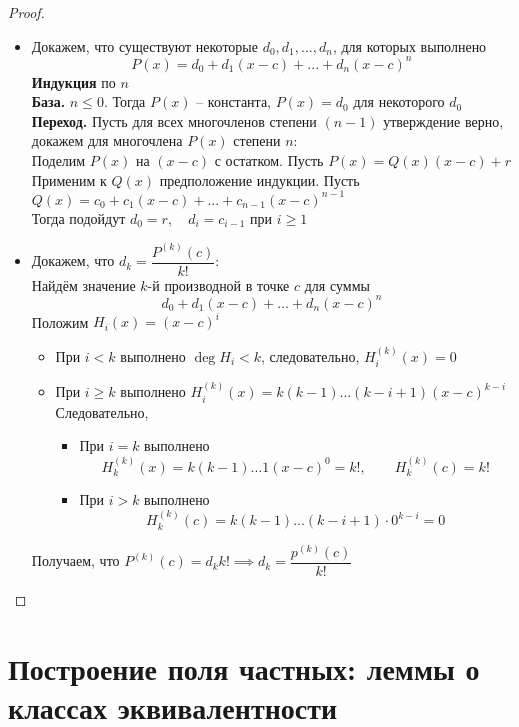\begin{proof}
	\hfill
	\begin{itemize}
		\item Докажем, что существуют некоторые $d_0, d_1, ..., d_n$, для которых выполнено
		$$ P(x) = d_0 + d_1(x - c) + ... + d_n(x - c)^n $$
		\textbf{Индукция} по $n$ \\
		\textbf{База.} $n \le 0 $. Тогда $P(x)$ -- константа, $P(x) = d_0$ для некоторого $d_0$ \\
		\textbf{Переход.} Пусть для всех многочленов степени $(n - 1)$ утверждение верно, докажем для многочлена $P(x)$ степени $n$: \\
		Поделим $P(x)$ на $(x - c)$ с остатком. Пусть $P(x) = Q(x)(x - c) + r$ \\
		Применим к $Q(x)$ предположение индукции. Пусть $Q(x) = c_0 + c_1(x - c) + ... + c_{n - 1}(x - c)^{n - 1} $ \\
		Тогда подойдут $d_0 = r, \quad d_i = c_{i - 1}$ при $i \ge 1$
		\item Докажем, что $d_k = \dfrac{P^{(k)}(c)}{k!}$: \\
		Найдём значение $k$-й производной в точке $c$ для суммы
		$$ d_0 + d_1(x - c) + ... + d_n(x - c)^n $$
		Положим $H_i(x) = (x - c)^i $
		\begin{itemize}
			\item При $i < k$ выполнено $ \deg H_i < k$, следовательно, $H_i^{(k)}(x) = 0 $
			\item При $i \ge k$ выполнено $H_i^{(k)}(x) = k(k - 1)...(k - i + 1)(x - c)^{k - i} $ \\
			Следовательно,
			\begin{itemize}
				\item При $i = k$ выполнено
				$$ H_k^{(k)}(x) = k(k - 1)...1(x - c)^0 = k!, \qquad H_k^{(k)}(c) = k! $$
				\item При $i > k$ выполнено
				$$ H_k^{(k)}(c) = k(k - 1)...(k - i + 1) \cdot 0^{k - i} = 0 $$
			\end{itemize}
		\end{itemize}
		Получаем, что $P^{(k)}(c) = d_kk! \implies d_k = \dfrac{p^{(k)}(c)}{k!} $
	\end{itemize}
\end{proof}

\section{Построение поля частных: леммы о классах эквивалентности}

